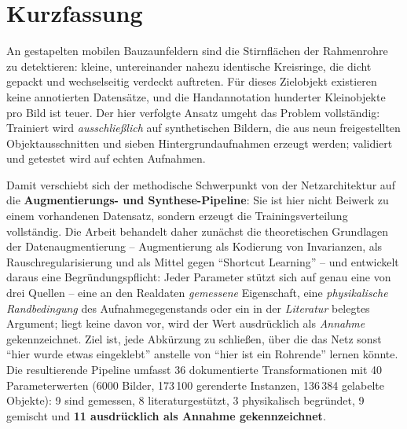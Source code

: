 \chapter*{Kurzfassung}
\thispagestyle{plain}

An gestapelten mobilen Bauzaunfeldern sind die Stirnflächen der Rahmenrohre zu
detektieren: kleine, untereinander nahezu identische Kreisringe, die dicht
gepackt und wechselseitig verdeckt auftreten.
Für dieses Zielobjekt existieren keine annotierten Datensätze, und die
Handannotation hunderter Kleinobjekte pro Bild ist teuer. Der hier verfolgte
Ansatz umgeht das Problem vollständig: Trainiert wird \emph{ausschließlich} auf
synthetischen Bildern, die aus neun freigestellten Objektausschnitten und sieben
Hintergrundaufnahmen erzeugt werden; validiert und getestet wird auf echten
Aufnahmen.

Damit verschiebt sich der methodische Schwerpunkt von der Netzarchitektur auf die
\textbf{Augmentierungs- und Synthese-Pipeline}: Sie ist hier nicht Beiwerk zu
einem vorhandenen Datensatz, sondern erzeugt die Trainingsverteilung vollständig.
Die Arbeit behandelt daher zunächst die theoretischen Grundlagen der
Datenaugmentierung -- Augmentierung als Kodierung von Invarianzen, als
Rauschregularisierung und als Mittel gegen \enquote{Shortcut Learning} -- und
entwickelt daraus eine Begründungspflicht: Jeder Parameter stützt sich auf genau
eine von drei Quellen -- eine an den Realdaten \emph{gemessene} Eigenschaft, eine
\emph{physikalische Randbedingung} des Aufnahmegegenstands oder ein in der
\emph{Literatur} belegtes Argument; liegt keine davon vor, wird der Wert
ausdrücklich als \emph{Annahme} gekennzeichnet. Ziel ist, jede Abkürzung zu
schließen, über die das Netz sonst \enquote{hier wurde etwas eingeklebt} anstelle
von \enquote{hier ist ein Rohrende} lernen könnte. Die resultierende Pipeline
umfasst 36 dokumentierte Transformationen mit 40 Parameterwerten (6000 Bilder,
173\,100 gerenderte Instanzen, 136\,384 gelabelte Objekte): 9 sind gemessen,
8 literaturgestützt, 3 physikalisch begründet, 9 gemischt und \textbf{11
ausdrücklich als Annahme gekennzeichnet}.

